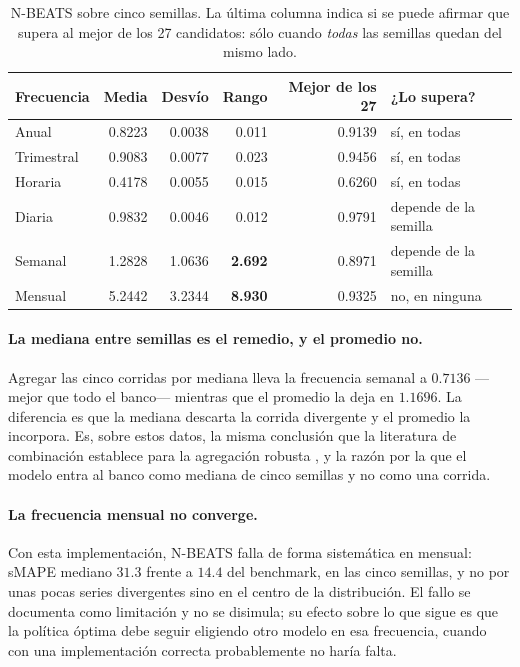 \begin{table}[htbp]
\centering
\caption{N-BEATS sobre cinco semillas. La última columna indica si se puede afirmar que
supera al mejor de los 27 candidatos: sólo cuando \emph{todas} las semillas quedan del
mismo lado.}
\label{tab:nbeats}
\begin{tabular}{lrrrrl}
\toprule
\textbf{Frecuencia} & \textbf{Media} & \textbf{Desvío} & \textbf{Rango} &
\textbf{Mejor de los 27} & \textbf{¿Lo supera?} \\
\midrule
Anual      & 0.8223 & 0.0038 & 0.011 & 0.9139 & sí, en todas \\
Trimestral & 0.9083 & 0.0077 & 0.023 & 0.9456 & sí, en todas \\
Horaria    & 0.4178 & 0.0055 & 0.015 & 0.6260 & sí, en todas \\
Diaria     & 0.9832 & 0.0046 & 0.012 & 0.9791 & depende de la semilla \\
Semanal    & 1.2828 & 1.0636 & \textbf{2.692} & 0.8971 & depende de la semilla \\
Mensual    & 5.2442 & 3.2344 & \textbf{8.930} & 0.9325 & no, en ninguna \\
\bottomrule
\end{tabular}
\end{table}

\paragraph{La mediana entre semillas es el remedio, y el promedio no.} Agregar las cinco
corridas por mediana lleva la frecuencia semanal a $0.7136$ ---mejor que todo el
banco--- mientras que el promedio la deja en $1.1696$. La diferencia es que la mediana
descarta la corrida divergente y el promedio la incorpora. Es, sobre estos datos, la
misma conclusión que la literatura de combinación establece para la agregación robusta
\cite{wang2023}, y la razón por la que el modelo entra al banco como mediana de cinco
semillas y no como una corrida.

\paragraph{La frecuencia mensual no converge.} Con esta implementación, N-BEATS falla de
forma sistemática en mensual: sMAPE mediano $31.3$ frente a $14.4$ del benchmark, en las
cinco semillas, y no por unas pocas series divergentes sino en el centro de la
distribución. El fallo se documenta como limitación y no se disimula; su efecto sobre lo
que sigue es que la política óptima debe seguir eligiendo otro modelo en esa frecuencia,
cuando con una implementación correcta probablemente no haría falta.

